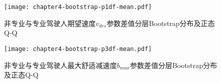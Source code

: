%

\begin{figure}[htbp]
\begin{center}
\texttt{[image: chapter4-bootstrap-p1df-mean.pdf]}
\end{center}
\caption{非专业与专业驾驶人期望速度$v_{des}$参数差值分层Bootstrap分布及正态Q-Q}
\label{p1-df-qq}
\end{figure}





%

\begin{figure}[htbp]
\begin{center}
\texttt{[image: chapter4-bootstrap-p3df-mean.pdf]}
\end{center}
\caption{非专业与专业驾驶人最大舒适减速度$b_{max}$参数差值分层Bootstrap分布及正态Q-Q}
\label{p3-df-qq}
\end{figure}








%


